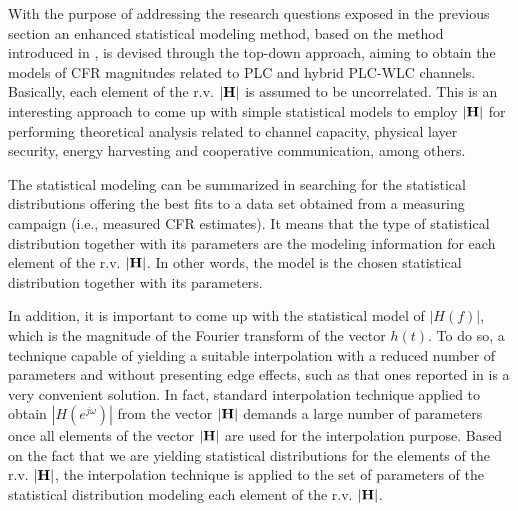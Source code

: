 \documentclass[journal]{IEEEtran}
\begin{document}
With the purpose of addressing the research questions exposed in the previous section an enhanced statistical modeling method, based on the method introduced in \cite{Luis:AI}, is devised through the top-down approach, aiming to obtain the models of \ac{CFR} magnitudes related to \ac{PLC} and hybrid \ac{PLC}-\ac{WLC} channels. Basically, each element of the \ac{r.v.} ${\bf |H|}$ is assumed to be uncorrelated. This is an interesting approach to come up with simple statistical models to employ ${\bf |H|}$ for performing theoretical analysis related to channel capacity, physical layer security, energy harvesting and cooperative communication, among others.

The statistical modeling can be summarized in searching for the statistical distributions offering the best fits to a data set obtained from a measuring campaign (i.e., measured \ac{CFR} estimates). It means that the type of statistical distribution together with its parameters are the modeling information for each element of the \ac{r.v.}  ${\bf |H|}$. In other words, the model is the chosen statistical distribution together with its parameters.

In addition, it is important to come up with the statistical model of $|H(f)|$, which is the magnitude of the Fourier transform of the vector $h(t)$. To do so, a technique capable of yielding a suitable interpolation with a reduced number of parameters and without presenting edge effects, such as that ones reported in \cite{Luis:AI} is a very convenient solution. In fact, standard interpolation technique applied to obtain $|H(e^{j\omega})|$ from the vector $\bf |H|$ demands a large number of parameters \cite{mitra} once all elements of the vector $\bf |H|$ are used for the interpolation purpose. Based on the fact that we are yielding statistical distributions for the elements of the \ac{r.v.} $\bf |H|$, the interpolation technique is applied to the set of parameters of the statistical distribution modeling each element of the \ac{r.v.} $\bf |H|$.
\end{document}
